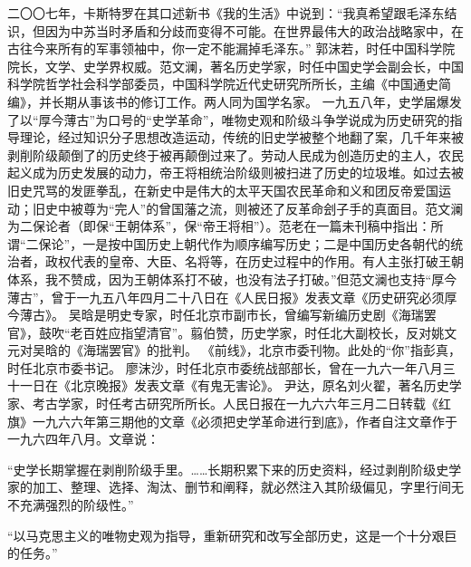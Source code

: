 \begin{maonote}
二〇〇七年，卡斯特罗在其口述新书《我的生活》中说到：“我真希望跟毛泽东结识，但因为中苏当时矛盾和分歧而变得不可能。在世界最伟大的政治战略家中，在古往今来所有的军事领袖中，你一定不能漏掉毛泽东。”
郭沫若，时任中国科学院院长，文学、史学界权威。范文澜，著名历史学家，时任中国史学会副会长，中国科学院哲学社会科学部委员，中国科学院近代史研究所所长，主编《中国通史简编》，并长期从事该书的修订工作。两人同为国学名家。
一九五八年，史学届爆发了以“厚今薄古”为口号的“史学革命”，唯物史观和阶级斗争学说成为历史研究的指导理论，经过知识分子思想改造运动，传统的旧史学被整个地翻了案，几千年来被剥削阶级颠倒了的历史终于被再颠倒过来了。劳动人民成为创造历史的主人，农民起义成为历史发展的动力，帝王将相统治阶级则被扫进了历史的垃圾堆。如过去被旧史咒骂的发匪拳乱，在新史中是伟大的太平天国农民革命和义和团反帝爱国运动；旧史中被尊为“完人”的曾国藩之流，则被还了反革命刽子手的真面目。范文澜为二保论者（即保“王朝体系”，保“帝王将相”）。范老在一篇未刊稿中指出：所谓“二保论”，一是按中国历史上朝代作为顺序编写历史；二是中国历史各朝代的统治者，政权代表的皇帝、大臣、名将等，在历史过程中的作用。有人主张打破王朝体系，我不赞成，因为王朝体系打不破，也没有法子打破。”但范文澜也支持“厚今薄古”，曾于一九五八年四月二十八日在《人民日报》发表文章《历史研究必须厚今薄古》。
吴晗是明史专家，时任北京市副市长，曾编写新编历史剧《海瑞罢官》，鼓吹“老百姓应指望清官”。翦伯赞，历史学家，时任北大副校长，反对姚文元对吴晗的《海瑞罢官》的批判。
《前线》，北京市委刊物。此处的“你”指彭真，时任北京市委书记。
廖沫沙，时任北京市委统战部部长，曾在一九六一年八月三十一日在《北京晚报》发表文章《有鬼无害论》。
尹达，原名刘火翟，著名历史学家、考古学家，时任考古研究所所长。人民日报在一九六六年三月二日转载《红旗》一九六六年第三期他的文章《必须把史学革命进行到底》，作者自注文章作于一九六四年八月。文章说：

“史学长期掌握在剥削阶级手里。……长期积累下来的历史资料，经过剥削阶级史学家的加工、整理、选择、淘汰、删节和阐释，就必然注入其阶级偏见，字里行间无不充满强烈的阶级性。”

“以马克思主义的唯物史观为指导，重新研究和改写全部历史，这是一个十分艰巨的任务。”


\end{maonote}

